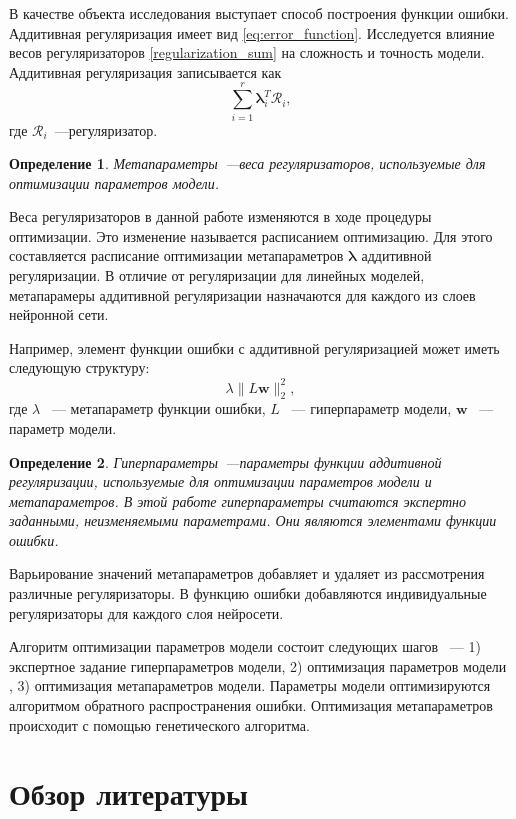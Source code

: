 \documentclass[12pt, twoside]{article}
\newcommand{\wm}{{\mathbf{w}}}
\newtheorem{definition}{Определение}
\begin{document}
В качестве объекта исследования выступает способ построения функции ошибки. Аддитивная регуляризация имеет вид \eqref{eq:error_function}. Исследуется влияние весов регуляризаторов  \eqref{regularization_sum} на сложность и точность модели.
Аддитивная регуляризация записывается как
\begin{equation}\label{regularization_sum}
\sum\limits_{i=1}^r \mathbf{\lambda}_i^T\mathcal{R}_i,    
\end{equation}
где $\mathcal{R}_i$~---регуляризатор.
\begin{definition}%
Метапараметры~---веса регуляризаторов, используемые для оптимизации параметров модели.
\end{definition}
Веса регуляризаторов в данной работе изменяются в ходе процедуры оптимизации. Это изменение называется расписанием оптимизацию.
Для этого составляется расписание оптимизации метапараметров $\mathbf{\lambda}$ аддитивной регуляризации. В отличие от регуляризации для линейных моделей, метапарамеры аддитивной регуляризации назначаются для каждого из слоев нейронной сети. 

Например, элемент функции ошибки с аддитивной регуляризацией может иметь следующую структуру:
\[\lambda \|L\wm\|_2^2,\]
где $\lambda$ ~--- метапараметр функции ошибки, $L$ ~--- гиперпараметр модели, $\wm$ ~--- параметр модели.


\begin{definition}%
Гиперпараметры~---параметры функции аддитивной регуляризации, используемые для оптимизации параметров модели и метапараметров. В этой работе гиперпараметры считаются экспертно заданными, неизменяемыми параметрами. Они являются элементами функции ошибки.
\end{definition}

Варьирование значений метапараметров добавляет и удаляет из рассмотрения различные регуляризаторы. В функцию ошибки добавляются индивидуальные регуляризаторы для каждого слоя нейросети.

Алгоритм оптимизации параметров модели состоит следующих шагов ~--- 
1) экспертное задание гиперпараметров модели, 2) оптимизация параметров модели
, 3) оптимизация метапараметров модели. Параметры модели оптимизируются алгоритмом обратного распространения ошибки. Оптимизация метапараметров происходит с помощью генетического алгоритма.



\section{Обзор литературы}
\end{document}
